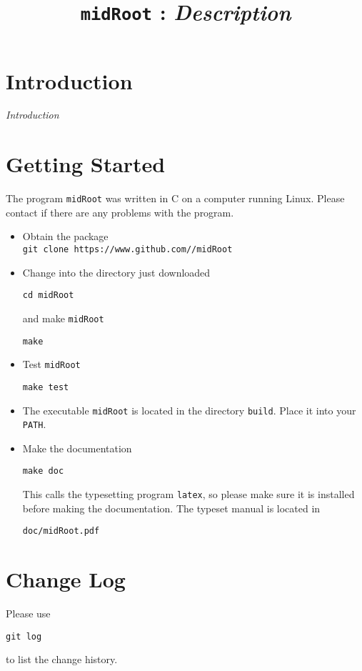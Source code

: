 \documentclass[a4paper, english]{article}
\begin{document}
\title{\texttt{midRoot} : \emph{Description}}
\author{}

\date{}
\maketitle

\section{Introduction} 
\emph{Introduction}

\section{Getting Started}
The program \texttt{midRoot} was written in C on a computer running Linux.
Please contact \texttt{} if there are any problems
with the program.
\begin{itemize}
\item Obtain the package\\
\texttt{git clone https://www.github.com//midRoot}
\item Change into the directory just downloaded
\begin{verbatim}
cd midRoot
\end{verbatim}
and make \texttt{midRoot}
\begin{verbatim}
make
\end{verbatim}
\item Test \texttt{midRoot}
\begin{verbatim}
make test
\end{verbatim}
\item The executable \texttt{midRoot} is located in the
  directory \texttt{build}. Place it into your \texttt{PATH}.
\item Make the documentation
\begin{verbatim}
make doc
\end{verbatim}
This calls the typesetting program \texttt{latex}, so please make sure
it is installed before making the documentation. The typeset manual is
located in
\begin{verbatim}
doc/midRoot.pdf
\end{verbatim}
\end{itemize}

\section{Change Log}
Please use
\begin{verbatim}
git log
\end{verbatim}
to list the change history.

\end{document}
